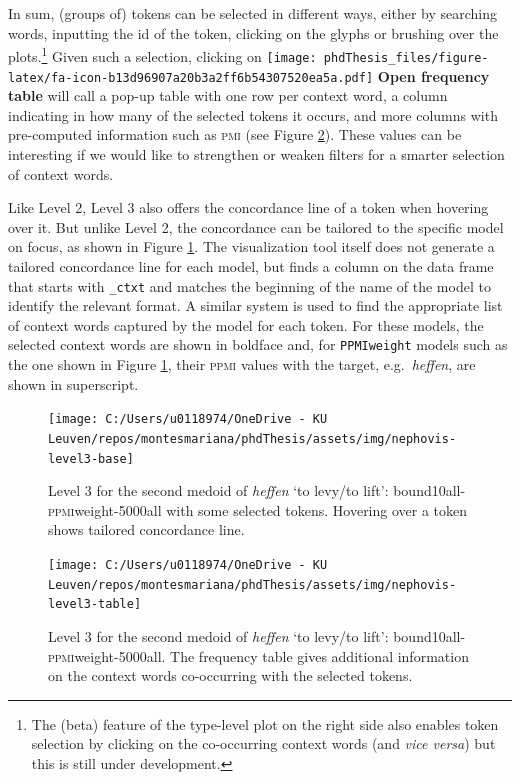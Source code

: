 \documentclass[
]{book}
\begin{document}
In sum, (groups of) tokens can be selected in different ways, either by searching words, inputting the id of the token, clicking on the glyphs or brushing over the plots.\footnote{The (beta) feature of the type-level plot on the right side also enables token selection by clicking on the co-occurring context words (and \emph{vice versa}) but this is still under development.} Given such a selection, clicking on \texttt{[image: phdThesis\_files/figure-latex/fa-icon-b13d96907a20b3a2ff6b54307520ea5a.pdf]} \textbf{Open frequency table} will call a pop-up table with one row per context word, a column indicating in how many of the selected tokens it occurs, and more columns with pre-computed information such as \textsc{pmi} (see Figure \ref{fig:nepho3-table}). These values can be interesting if we would like to strengthen or weaken filters for a smarter selection of context words.

Like Level 2, Level 3 also offers the concordance line of a token when hovering over it. But unlike Level 2, the concordance can be tailored to the specific model on focus, as shown in Figure \ref{fig:nepho3-base}. The visualization tool itself does not generate a tailored concordance line for each model, but finds a column on the data frame that starts with \texttt{\_ctxt} and matches the beginning of the name of the model to identify the relevant format. A similar system is used to find the appropriate list of context words captured by the model for each token. For these models, the selected context words are shown in boldface and, for \texttt{PPMIweight} models such as the one shown in Figure \ref{fig:nepho3-base}, their \textsc{ppmi} values with the target, e.g.~\emph{heffen}, are shown in superscript.



\begin{figure}
\texttt{[image: C:/Users/u0118974/OneDrive - KU Leuven/repos/montesmariana/phdThesis/assets/img/nephovis-level3-base]} \caption{Level 3 for the second medoid of \emph{heffen} `to levy/to lift': bound10all-\textsc{ppmi}weight-\textsc{5000}all with some selected tokens. Hovering over a token shows tailored concordance line.}\label{fig:nepho3-base}
\end{figure}



\begin{figure}
\texttt{[image: C:/Users/u0118974/OneDrive - KU Leuven/repos/montesmariana/phdThesis/assets/img/nephovis-level3-table]} \caption{Level 3 for the second medoid of \emph{heffen} `to levy/to lift': bound10all-\textsc{ppmi}weight-\textsc{5000}all. The frequency table gives additional information on the context words co-occurring with the selected tokens.}\label{fig:nepho3-table}
\end{figure}
\end{document}
